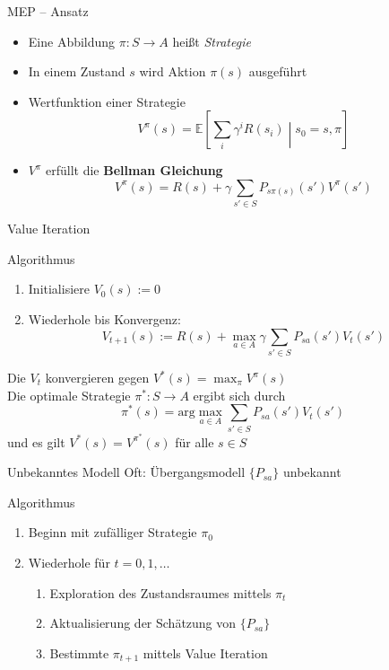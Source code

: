 \documentclass[xcolor={dvipsnames,svgnames},draft]{beamer}
\begin{document}
\begin{frame}{MEP -- Ansatz}
  \begin{itemize}
  \item Eine Abbildung $\pi : S \to A$ heißt \textit{Strategie}
  \item In einem Zustand $s$ wird Aktion $\pi(s)$ ausgeführt
  \item Wertfunktion einer Strategie \[V^\pi(s) =
    \mathbb{E}\left[\sum_i \gamma^i R(s_i) \middle| s_0 = s, \pi \right]\]
  \item $V^\pi$ erfüllt die \textbf{Bellman Gleichung}
    \[
      V^\pi(s) = R(s) + \gamma \sum_{s'\in S} P_{s\pi(s)}(s') V^\pi(s')
    \]
  \end{itemize}
\end{frame}

\begin{frame}{Value Iteration}
  \begin{block}{Algorithmus}
    \begin{enumerate}
    \item Initialisiere $V_0(s) := 0$
    \item Wiederhole bis Konvergenz:
      \[
        V_{t+1}(s) := R(s) + \max_{a\in A} \gamma \sum_{s' \in S} P_{sa}(s') V_t(s')
      \]
    \end{enumerate}
  \end{block}
  Die $V_t$ konvergieren gegen $V^{*}(s) = \max_{\pi} V^\pi(s)$ \\
  Die optimale Strategie $\pi^* : S \to A$ ergibt sich durch
  \[
    \pi^*(s) = \text{arg}\max_{a\in A} \sum_{s'\in S}P_{sa}(s') V_t(s')
  \]
  und es gilt $V^*(s) = V^{\pi^*}(s)$ für alle $s \in S$
\end{frame}

\begin{frame}{Unbekanntes Modell}
  Oft: Übergangsmodell $\{P_{sa}\}$ unbekannt

  \begin{block}{Algorithmus}
    \begin{enumerate}
    \item Beginn mit zufälliger Strategie $\pi_0$
    \item Wiederhole für $t=0,1,\ldots$
      \begin{enumerate}
      \item Exploration des Zustandsraumes mittels $\pi_t$
      \item Aktualisierung der Schätzung von $\{P_{sa}\}$
      \item Bestimmte $\pi_{t+1}$ mittels Value Iteration
      \end{enumerate}
    \end{enumerate}
  \end{block}
\end{frame}
\end{document}
